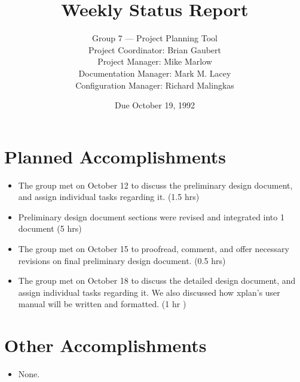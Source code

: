 


\title{Weekly Status Report}

\author{Group 7 --- Project Planning Tool\\
Project Coordinator: Brian Gaubert\\
Project Manager: Mike Marlow\\
Documentation Manager: Mark M. Lacey\\
Configuration Manager: Richard Malingkas}

\date{Due October 19, 1992}

\maketitle

%
%
%
\section{Planned Accomplishments}
\begin{itemize}
	\item The group met on October 12 to discuss the preliminary
 design document, and assign individual tasks regarding it. (1.5 hrs)
	\item Preliminary design document sections were revised and integrated into 1 document (5 hrs)
	\item The group met on October 15 to proofread, comment, and offer
necessary revisions on final preliminary design document. (0.5 hrs)
	\item The group met on October 18 to discuss the detailed  
design document, and assign individual tasks regarding it.  We also discussed
how xplan's  user manual will be written and formatted. (1 hr )

\end{itemize}

%
%
%
\section{Other Accomplishments}
\begin{itemize}
	\item None.
\end{itemize}

